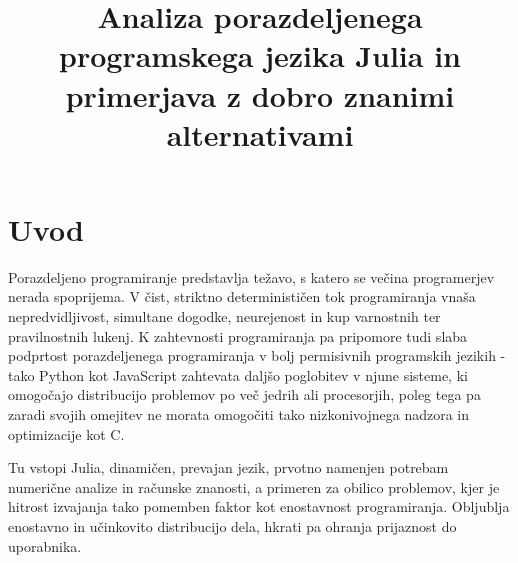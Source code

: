 \documentclass[journal,a4paper,twoside]{sty/IEEEtran}
\begin{document}
\title{Analiza porazdeljenega programskega jezika Julia in primerjava z dobro znanimi alternativami}

\address{Univerza v Ljubljani, Fakulteta za računalništvo in informatiko, Večna pot 113, 1000 Ljubljana, Slovenija}





\maketitle

\IEEEpeerreviewmaketitle


\section{Uvod}

Porazdeljeno programiranje predstavlja težavo, s katero se večina programerjev nerada spoprijema.
V čist, striktno determinističen tok programiranja vnaša nepredvidljivost, simultane dogodke, neurejenost in kup varnostnih ter pravilnostnih lukenj.
K zahtevnosti programiranja pa pripomore tudi slaba podprtost porazdeljenega programiranja v bolj permisivnih programskih jezikih - tako Python kot
	JavaScript zahtevata daljšo poglobitev v njune sisteme, ki omogočajo distribucijo problemov po več jedrih ali procesorjih, poleg tega pa zaradi
	svojih omejitev ne morata omogočiti tako nizkonivojnega nadzora in optimizacije kot C.

Tu vstopi Julia, dinamičen, prevajan jezik, prvotno namenjen potrebam numerične analize in računske znanosti, a primeren za obilico problemov, kjer je
	hitrost izvajanja tako pomemben faktor kot enostavnost programiranja.\cite{julia-site}
Obljublja enostavno in učinkovito distribucijo dela, hkrati pa ohranja prijaznost do uporabnika.
\end{document}
